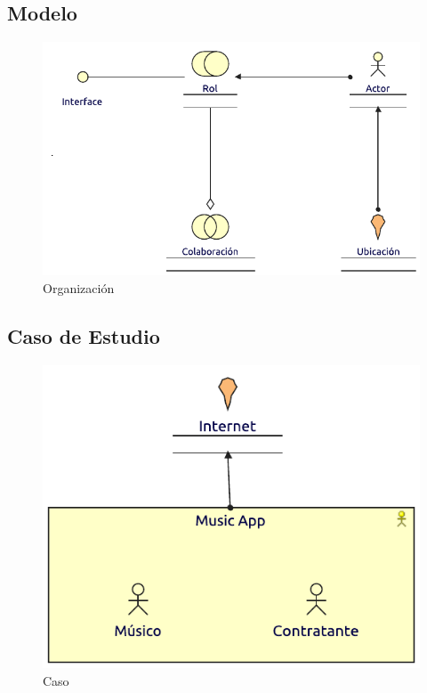 \subsection{Modelo}
\begin{figure}[h!]
	\centering
	\includegraphics[width=\linewidth]{Arquitectura/Negocio/imgs/organizacion.pdf}
	\caption{Organización}
\end{figure}
\newpage
\subsection{Caso de Estudio}

\begin{figure}[h!]
	\centering
	\includegraphics[width=0.8\linewidth]{Arquitectura/Negocio/imgs/caso.pdf}
	\caption{Caso}
\end{figure}

\newpage

